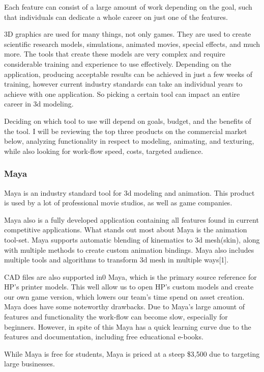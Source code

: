 \documentclass[onecolumn, draftclsnofoot,10pt, compsoc]{IEEEtran}
\begin{document}
Each feature can consist of a large amount of work depending on the goal, such that individuals can dedicate a whole career on just one of the features.

3D graphics are used for many things, not only games. They are used to create scientific research models, simulations, animated movies, special effects, and much more. The tools that create these models are very complex and require considerable training and experience to use effectively. Depending on the application, producing acceptable results can be achieved in just a few weeks of training, however current industry standards can take an individual years to achieve with one application. So picking a certain tool can impact an entire career in 3d modeling. 
 
Deciding on which tool to use will depend on goals, budget, and the benefits of the tool. I will be reviewing the top three products on the commercial market below, analyzing functionality in respect to modeling, animating, and texturing, while also looking for work-flow speed, costs, targeted audience.

\subsubsection{Maya}
Maya is an industry standard tool for 3d modeling and animation. This product is used by a lot of professional movie studios, as well as game companies. 

Maya also is a fully developed application containing all features found in current competitive applications. What stands out most about Maya is the animation tool-set. Maya supports automatic blending of kinematics to 3d mesh(skin), along with multiple methods to create custom animation bindings. Maya also includes multiple tools and algorithms to transform 3d mesh in multiple ways[1]. 

CAD files are also supported in0 Maya, which is the primary source reference for HP’s printer models. This well allow us to open HP’s custom models and create our own game version, which lowers our team’s time spend on asset creation. Maya does have some noteworthy drawbacks. Due to Maya’s large amount of features and functionality the work-flow can become slow, especially for beginners. However, in spite of this Maya has a quick learning curve due to the features and documentation, including free educational e-books.

While Maya is free for students, Maya is priced at a steep \$3,500 due to targeting large businesses.
\end{document}
